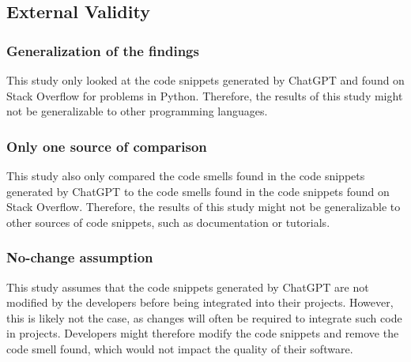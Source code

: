 \subsection{External Validity}
\label{sec:threats-to-validity-external}

\subsubsection{Generalization of the findings}
This study only looked at the code snippets generated by ChatGPT and found on Stack Overflow for problems in Python. Therefore, the results of this study might not be generalizable to other programming languages. \\

\subsubsection{Only one source of comparison}
This study also only compared the code smells found in the code snippets generated by ChatGPT to the code smells found in the code snippets found on Stack Overflow. Therefore, the results of this study might not be generalizable to other sources of code snippets, such as documentation or tutorials. \\

\subsubsection{No-change assumption}
This study assumes that the code snippets generated by ChatGPT are not modified by the developers before being integrated into their projects. However, this is likely not the case, as changes will often be required to integrate such code in projects. Developers might therefore modify the code snippets and remove the code smell found, which would not impact the quality of their software. \\